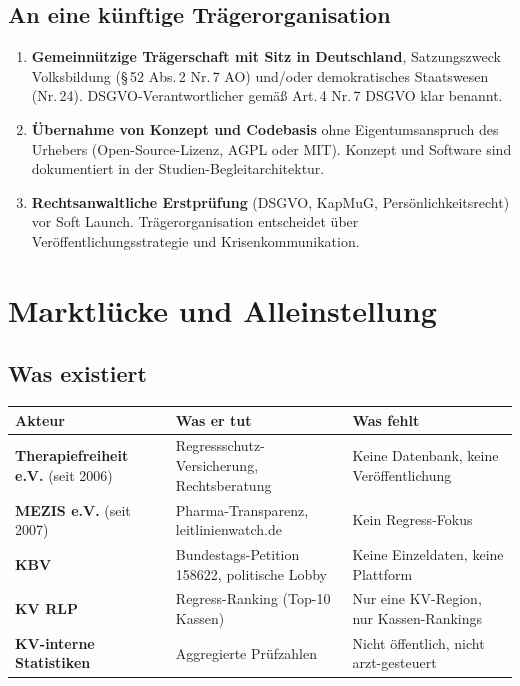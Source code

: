 \documentclass{umbruch-position}
\begin{document}
\subsection{An eine künftige Trägerorganisation}

\begin{enumerate}[nosep,leftmargin=*]
  \item \textbf{Gemeinnützige Trägerschaft mit Sitz in Deutschland}, Satzungszweck Volksbildung (\S\,52 Abs.\,2 Nr.\,7 AO) und/oder demokratisches Staatswesen (Nr.\,24). DSGVO-Verantwortlicher gemäß Art.\,4 Nr.\,7 DSGVO klar benannt.
  \item \textbf{Übernahme von Konzept und Codebasis} ohne Eigentumsanspruch des Urhebers (Open-Source-Lizenz, AGPL oder MIT). Konzept und Software sind dokumentiert in der Studien-Begleitarchitektur.
  \item \textbf{Rechtsanwaltliche Erstprüfung} (DSGVO, KapMuG, Persönlichkeitsrecht) vor Soft Launch. Trägerorganisation entscheidet über Veröffentlichungsstrategie und Krisenkommunikation.
\end{enumerate}


\section{Marktlücke und Alleinstellung}

\subsection{Was existiert}

{\small
\begin{tabularx}{\textwidth}{X X X}
\toprule
\textbf{Akteur} & \textbf{Was er tut} & \textbf{Was fehlt} \\
\midrule
\textbf{Therapiefreiheit e.V.} (seit 2006) & Regressschutz-Versicherung, Rechtsberatung & Keine Datenbank, keine Veröffentlichung \\
\textbf{MEZIS e.V.} (seit 2007) & Pharma-Transparenz, leitlinienwatch.de & Kein Regress-Fokus \\
\textbf{KBV} & Bundestags-Petition 158622, politische Lobby & Keine Einzeldaten, keine Plattform \\
\textbf{KV RLP} & Regress-Ranking (Top-10 Kassen) & Nur eine KV-Region, nur Kassen-Rankings \\
\textbf{KV-interne Statistiken} & Aggregierte Prüfzahlen & Nicht öffentlich, nicht arzt-gesteuert \\
\bottomrule
\end{tabularx}
}
\end{document}
